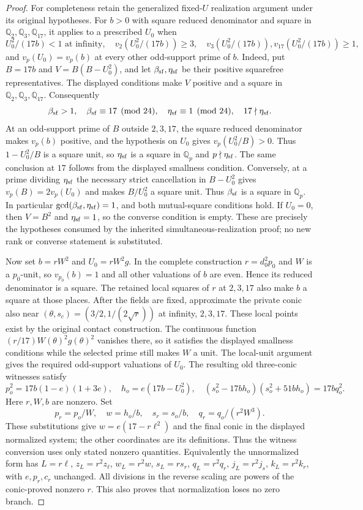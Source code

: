 \documentclass[11pt]{article}
\theoremstyle{definition}
\theoremstyle{remark}
\newcommand{\Q}{\mathbb Q}
\begin{document}
\begin{proof}
For completeness retain the generalized fixed-$U$ realization argument
under its original hypotheses. For $b>0$ with square reduced denominator
and square in $\Q_2,\Q_3,\Q_{17}$, it applies to a prescribed $U_0$ when
\[
 U_0^2/(17b)<1\text{ at infinity},\quad
 v_2(U_0^2/(17b))\ge3,\quad
 v_3(U_0^2/(17b)),v_{17}(U_0^2/(17b))\ge1,
\]
and $v_p(U_0)=v_p(b)$ at every other odd-support prime of $b$.
Indeed, put $B=17b$ and $V=B(B-U_0^2)$, and let
$\beta_{\rm sf},\eta_{\rm sf}$ be their positive squarefree representatives.
The displayed conditions make $V$ positive and a square in
$\Q_2,\Q_3,\Q_{17}$. Consequently
\[
 \beta_{\rm sf}>1,\quad \beta_{\rm sf}\equiv17\pmod{24},\quad
 \eta_{\rm sf}\equiv1\pmod{24},\quad 17\nmid\eta_{\rm sf}.
\]
At an odd-support prime of $B$ outside $2,3,17$, the square reduced
denominator makes $v_p(b)$ positive, and the hypothesis on $U_0$ gives
$v_p(U_0^2/B)>0$. Thus $1-U_0^2/B$ is a square unit, so
$\eta_{\rm sf}$ is a square in $\Q_p$ and $p\nmid\eta_{\rm sf}$.
The same conclusion at $17$ follows from the displayed smallness condition.
Conversely, at a prime dividing $\eta_{\rm sf}$ the necessary strict
cancellation in $B-U_0^2$ gives $v_p(B)=2v_p(U_0)$ and makes
$B/U_0^2$ a square unit. Thus $\beta_{\rm sf}$ is a square in $\Q_p$.
In particular $\gcd(\beta_{\rm sf},\eta_{\rm sf})=1$, and both
mutual-square conditions hold. If $U_0=0$, then $V=B^2$ and
$\eta_{\rm sf}=1$, so the converse condition is empty. These are precisely
the hypotheses consumed by the inherited simultaneous-realization proof;
no new rank or converse statement is substituted.

Now set $b=rW^2$ and $U_0=rW^2g$. In the complete construction
$r=d_0^2p_0$ and $W$ is a $p_0$-unit, so $v_{p_0}(b)=1$ and all
other valuations of $b$ are even. Hence its reduced denominator is a
square. The retained local squares of $r$ at $2,3,17$ also make $b$ a
square at those places. After the fields are fixed, approximate
the private conic also near $(\theta,s_c)=(3/2,1/(2\sqrt r))$ at infinity,
$2,3,17$. These local points exist by the original contact construction.
The continuous function $(r/17)W(\theta)^2g(\theta)^2$ vanishes there,
so it satisfies the displayed smallness conditions while the selected
prime still makes $W$ a unit. The local-unit argument gives the required
odd-support valuations of $U_0$. The resulting old three-conic witnesses satisfy
\[
 p_o^2=17b(1-e)(1+3e),\quad h_o=e(17b-U_0^2),\quad
 (s_o^2-17bh_o)(s_o^2+51bh_o)=17bq_o^2.
\]
Here $r,W,b$ are nonzero. Set
\[
 p_r=p_o/W,\quad w=h_o/b,\quad
 s_r=s_o/b,\quad q_r=q_o/(r^2W^3).
\]
These substitutions give $w=e(17-r\ell^2)$ and the final conic in the
displayed normalized system; the other coordinates are its definitions.
Thus the witness conversion uses only stated nonzero quantities.
Equivalently the unnormalized form
has $L=r\ell$, $z_L=r^2z_\ell$, $w_L=r^2w$, $s_L=rs_r$,
$q_L=r^2q_r$, $j_L=r^2j_s$, $k_L=r^2k_r$, with $e,p_r,c_r$ unchanged.
All divisions in the reverse scaling are powers of the conic-proved
nonzero $r$. This also proves that normalization loses no zero branch.
\end{proof}
\end{document}
